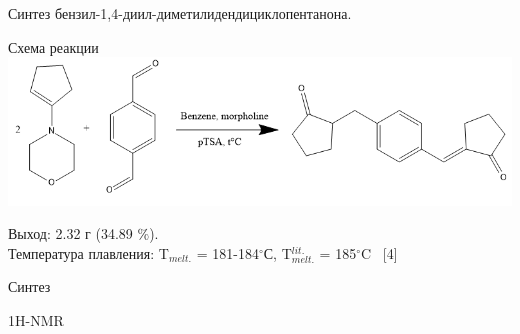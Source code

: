\documentclass{beamer}
\begin{document}
\begin{frame}{Синтез бензил-1,4-диил-диметилидендициклопентанона.}
\begin{block}{Схема реакции}
\includegraphics[scale=0.6]{../pictures/4.png}
\end{block}
\begin{block}{1}
Выход: 2.32 г (34.89 $\%$). \\
Температура плавления: T$_{melt.}$ = 181-184$^{\circ}$С, T$_{melt.}^{lit.}$ = 185$^{\circ}$C \ [4] \\
\end{block}
\end{frame}

\begin{frame}{Синтез}
\begin{block}{1H-NMR}
\end{block}
\end{frame}
\end{document}
